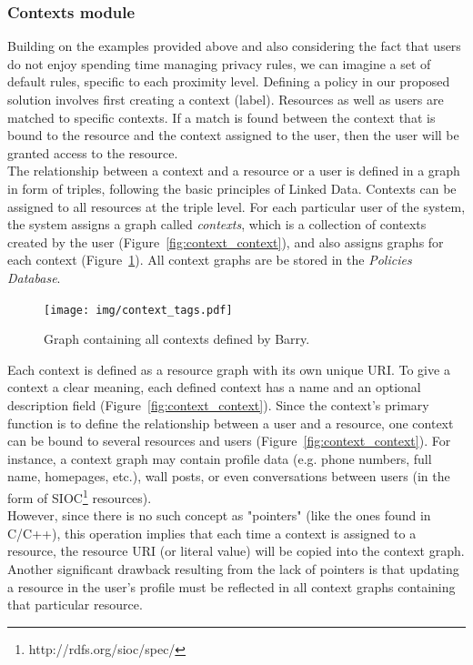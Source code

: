 \subsubsection{Contexts module}
Building on the examples provided above and also considering the fact that users do not enjoy spending time managing privacy rules, we can imagine a set of default rules, specific to each proximity level. Defining a policy in our proposed solution involves first creating a context (label). Resources as well as users are matched to specific contexts. If a match is found between the context that is bound to the resource and the context assigned to the user, then the user will be granted access to the resource.\\

The relationship between a context and a resource or a user is defined in a graph in form of triples, following the basic principles of Linked Data. Contexts can be assigned to all resources at the triple level. For each particular user of the system, the system assigns a graph called \textit{contexts}, which is a collection of contexts created by the user (Figure~\ref{fig:context_context}), and also assigns graphs for each context (Figure~\ref{fig:context_tags}). All context graphs are be stored in the \textit{Policies Database}.\\

\begin{figure}[h]
  \begin{center}
    \texttt{[image: img/context\_tags.pdf]}
        \caption{Graph containing all contexts defined by Barry.}
        \label{fig:context_tags}
  \end{center}
\end{figure}

Each context is defined as a resource graph with its own unique URI. To give a context a clear meaning, each defined context has a name and an optional description field (Figure~\ref{fig:context_context}). Since the context's primary function is to define the relationship between a user and a resource, one context can be bound to several resources and users (Figure~\ref{fig:context_context}). For instance, a context graph may contain profile data (e.g. phone numbers, full name, homepages, etc.), wall posts, or even conversations between users (in the form of SIOC\footnote{http://rdfs.org/sioc/spec/} resources).\\

However, since there is no such concept as "pointers" (like the ones found in C/C++), this operation implies that each time a context is assigned to a resource, the resource URI (or literal value) will be copied into the context graph. Another significant drawback resulting from the lack of pointers is that updating a resource in the user's profile must be reflected in all context graphs containing that particular resource.\\

